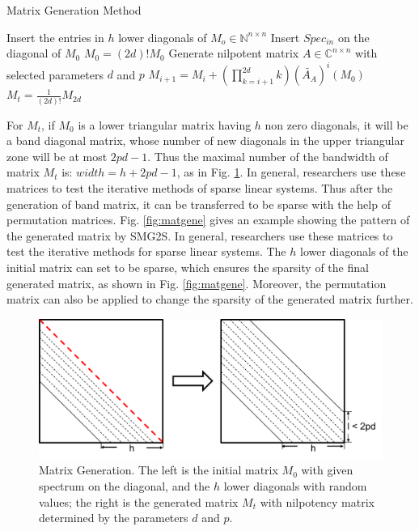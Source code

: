 \begin{algorithm*}[htbp]{}
	\caption{Matrix Generation Method}   
	\label{alg:matgen}   
	\begin{algorithmic}[1]
		\State Insert the entries in $h$ lower diagonals of $M_o \in \mathbb{N}^{n \times n}$
		\State Insert $Spec_{in}$ on the diagonal of $M_0$
		\State $M_0=(2d)!M_0$
		\State Generate nilpotent matrix $A \in \mathbb{C}^{n\times n}$ with selected parameters $d$ and $p$
		\State $M_{i+1}=M_i+(\prod_{k=i+1}^{2d}k)(\widetilde{A_A})^i(M_0)$
		\EndFor 
		\State $M_t = \frac{1}{(2d)!}M_{2d}$
		\EndFunction
	\end{algorithmic}
\end{algorithm*}

For $M_t$, if $M_0$ is a lower triangular matrix having $h$ non zero diagonals, it will be a band diagonal matrix, whose number of new diagonals in the upper triangular zone will be at most $2pd-1$. Thus the maximal number of the bandwidth of matrix $M_t$ is: $width = h + 2pd-1$, as in Fig. \ref{fig:matgen}. In general, researchers use these matrices to test the iterative methods of sparse linear systems. Thus after the generation of band matrix, it can be transferred to be sparse with the help of permutation matrices. Fig. \ref{fig:matgene} gives an example showing the pattern of the generated matrix by SMG2S. In general, researchers use these matrices to test the iterative methods for sparse linear systems. The $h$ lower diagonals of the initial matrix can set to be sparse, which ensures the sparsity of the final generated matrix, as shown in Fig. \ref{fig:matgene}. Moreover, the permutation matrix can also be applied to change the sparsity of the generated matrix further.

\begin{figure}[htbp]
	\centering
	\includegraphics[width=5.6in]{fig/matgen.pdf}
	\caption{Matrix Generation. The left is the initial matrix $M_0$ with given spectrum on the diagonal, and the $h$ lower diagonals with random values; the right is the generated matrix $M_t$ with nilpotency matrix determined by the parameters $d$ and $p$.}
	\label{fig:matgen}
\end{figure}

